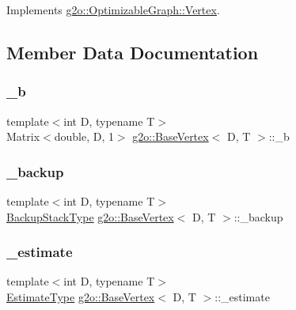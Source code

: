 Implements \mbox{\hyperlink{classg2o_1_1_optimizable_graph_1_1_vertex_a0a4ecc894d008d9c3806a3660e7dfe6f}{g2o\+::\+Optimizable\+Graph\+::\+Vertex}}.



\subsection{Member Data Documentation}
\mbox{\label{classg2o_1_1_base_vertex_a70c672f2997275927efa49c1f5b18ac3}} 
\subsubsection{\texorpdfstring{\+\_\+b}{\_b}}
{\footnotesize\ttfamily template$<$int D, typename T$>$ \\
Matrix$<$double, D, 1$>$ \mbox{\hyperlink{classg2o_1_1_base_vertex}{g2o\+::\+Base\+Vertex}}$<$ D, T $>$\+::\+\_\+b\hspace{0.3cm}{\ttfamily [protected]}}

\mbox{\label{classg2o_1_1_base_vertex_a936082916993857a77c8318bc3e59d23}} 
\subsubsection{\texorpdfstring{\+\_\+backup}{\_backup}}
{\footnotesize\ttfamily template$<$int D, typename T$>$ \\
\mbox{\hyperlink{classg2o_1_1_base_vertex_ae6632291d46b458196bdb021a6c8cba1}{Backup\+Stack\+Type}} \mbox{\hyperlink{classg2o_1_1_base_vertex}{g2o\+::\+Base\+Vertex}}$<$ D, T $>$\+::\+\_\+backup\hspace{0.3cm}{\ttfamily [protected]}}

\mbox{\label{classg2o_1_1_base_vertex_ab188c92c3e906c6e06507ae624c0e7ac}} 
\subsubsection{\texorpdfstring{\+\_\+estimate}{\_estimate}}
{\footnotesize\ttfamily template$<$int D, typename T$>$ \\
\mbox{\hyperlink{classg2o_1_1_base_vertex_aaffb179a0d591da4769ec7c3fc7f7daa}{Estimate\+Type}} \mbox{\hyperlink{classg2o_1_1_base_vertex}{g2o\+::\+Base\+Vertex}}$<$ D, T $>$\+::\+\_\+estimate\hspace{0.3cm}{\ttfamily [protected]}}

